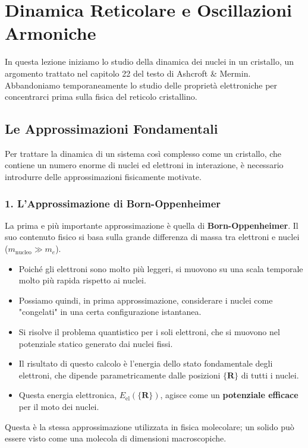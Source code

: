 \section{Dinamica Reticolare e Oscillazioni Armoniche}
\label{sec:lecture8}
In questa lezione iniziamo lo studio della dinamica dei nuclei in un cristallo, un argomento trattato nel capitolo 22 del testo di Ashcroft \& Mermin. Abbandoniamo temporaneamente lo studio delle proprietà elettroniche per concentrarci prima sulla fisica del reticolo cristallino.

\subsection{Le Approssimazioni Fondamentali}

Per trattare la dinamica di un sistema così complesso come un cristallo, che contiene un numero enorme di nuclei ed elettroni in interazione, è necessario introdurre delle approssimazioni fisicamente motivate.

\subsubsection{1. L'Approssimazione di Born-Oppenheimer}
La prima e più importante approssimazione è quella di \textbf{Born-Oppenheimer}. Il suo contenuto fisico si basa sulla grande differenza di massa tra elettroni e nuclei (\(m_{\text{nucleo}} \gg m_e\)).

\begin{itemize}
    \item Poiché gli elettroni sono molto più leggeri, si muovono su una scala temporale molto più rapida rispetto ai nuclei.
    \item Possiamo quindi, in prima approssimazione, considerare i nuclei come "congelati" in una certa configurazione istantanea.
    \item Si risolve il problema quantistico per i soli elettroni, che si muovono nel potenziale statico generato dai nuclei fissi.
    \item Il risultato di questo calcolo è l'energia dello stato fondamentale degli elettroni, che dipende parametricamente dalle posizioni \(\lbrace \mathbf{R} \rbrace\) di tutti i nuclei.
    \item Questa energia elettronica, \(E_{\text{el}}(\lbrace \mathbf{R} \rbrace)\), agisce come un \textbf{potenziale efficace} per il moto dei nuclei.
\end{itemize}
Questa è la stessa approssimazione utilizzata in fisica molecolare; un solido può essere visto come una molecola di dimensioni macroscopiche.

